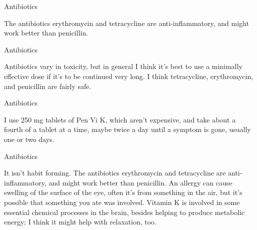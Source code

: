 \documentclass[11pt,oneside,openany,extrafontsizes]{memoir}
\begin{document}
\begin{standalonequote}{Antibiotics}

    \begin{answer}
       The antibiotics erythromycin and tetracycline are anti-inflammatory, and might work better than penicillin. 
    \end{answer}
\end{standalonequote}

\begin{standalonequote}{Antibiotics}

    \begin{answer}
       Antibiotics vary in toxicity, but in general I think it's best to use a minimally effective dose if it's to be continued very long. I think tetracycline, erythromycin, and penicillin are fairly safe. 
    \end{answer}
\end{standalonequote}

\begin{standalonequote}{Antibiotics}

    \begin{answer}
       I use 250 mg tablets of Pen Vi K, which aren't expensive, and take about a fourth of a tablet at a time, maybe twice a day until a symptom is gone, usually one or two days. 
    \end{answer}
\end{standalonequote}

\begin{standalonequote}{Antibiotics}

    \begin{answer}
       It isn't habit forming. The antibiotics erythromycin and tetracycline are anti-inflammatory, and might work better than penicillin. An allergy can cause swelling of the surface of the eye, often it's from something in the air, but it's possible that something you ate was involved. Vitamin K is involved in some essential chemical processes in the brain, besides helping to produce metabolic energy; I think it might help with relaxation, too. 
    \end{answer}
\end{standalonequote}
\end{document}
